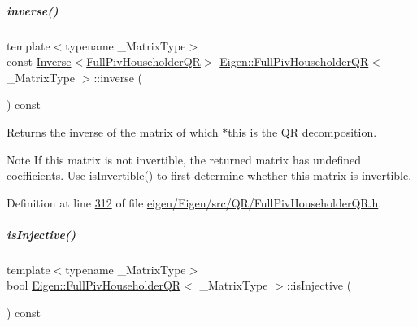 \mbox{\label{group___q_r___module_a352ce66397af06da214ddde343cec6f5}} 
\subparagraph{\texorpdfstring{inverse()}{inverse()}\hspace{0.1cm}{\footnotesize\ttfamily [2/2]}}
{\footnotesize\ttfamily template$<$typename \+\_\+\+Matrix\+Type$>$ \\
const \hyperlink{class_eigen_1_1_inverse}{Inverse}$<$\hyperlink{group___q_r___module_class_eigen_1_1_full_piv_householder_q_r}{Full\+Piv\+Householder\+QR}$>$ \hyperlink{group___q_r___module_class_eigen_1_1_full_piv_householder_q_r}{Eigen\+::\+Full\+Piv\+Householder\+QR}$<$ \+\_\+\+Matrix\+Type $>$\+::inverse (\begin{DoxyParamCaption}{ }\end{DoxyParamCaption}) const\hspace{0.3cm}{\ttfamily [inline]}}

\begin{DoxyReturn}{Returns}
the inverse of the matrix of which $\ast$this is the QR decomposition.
\end{DoxyReturn}
\begin{DoxyNote}{Note}
If this matrix is not invertible, the returned matrix has undefined coefficients. Use \hyperlink{group___q_r___module_aeb1d779ec22ec68a5a28d4235db02ec1}{is\+Invertible()} to first determine whether this matrix is invertible. 
\end{DoxyNote}


Definition at line \hyperlink{eigen_2_eigen_2src_2_q_r_2_full_piv_householder_q_r_8h_source_l00312}{312} of file \hyperlink{eigen_2_eigen_2src_2_q_r_2_full_piv_householder_q_r_8h_source}{eigen/\+Eigen/src/\+Q\+R/\+Full\+Piv\+Householder\+Q\+R.\+h}.

\mbox{\label{group___q_r___module_a6776788011026b0f63192485a59deaed}} 
\subparagraph{\texorpdfstring{is\+Injective()}{isInjective()}\hspace{0.1cm}{\footnotesize\ttfamily [1/2]}}
{\footnotesize\ttfamily template$<$typename \+\_\+\+Matrix\+Type$>$ \\
bool \hyperlink{group___q_r___module_class_eigen_1_1_full_piv_householder_q_r}{Eigen\+::\+Full\+Piv\+Householder\+QR}$<$ \+\_\+\+Matrix\+Type $>$\+::is\+Injective (\begin{DoxyParamCaption}{ }\end{DoxyParamCaption}) const\hspace{0.3cm}{\ttfamily [inline]}}

